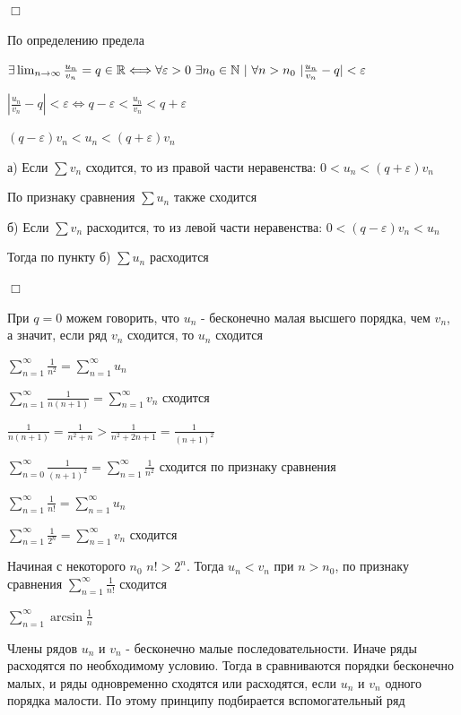 \documentclass[12pt]{article}
\begin{document}
    \begin{MyProof}
        $\Box$

        По определению предела

        $\exists \lim_{n \to \infty} \frac{u_n}{v_n} = q \in \Real \Longleftrightarrow \forall \varepsilon > 0 \ \exists n_0 \in \Natural \ | \ \forall n > n_0 \ |\frac{u_n}{v_n} - q| < \varepsilon$

        $|\frac{u_n}{v_n} - q| < \varepsilon \Longleftrightarrow q - \varepsilon < \frac{u_n}{v_n} < q + \varepsilon$

        $(q - \varepsilon) v_n < u_n < (q + \varepsilon) v_n$

        а) Если $\sum v_n$ сходится, то из правой части неравенства: $0 < u_n < (q + \varepsilon) v_n$

        По признаку сравнения $\sum u_n$ также сходится

        б) Если $\sum v_n$ расходится, то из левой части неравенства: $0 < (q - \varepsilon) v_n < u_n$

        Тогда по пункту б)  $\sum u_n$ расходится

        $\Box$
    \end{MyProof}

    \Nota При $q = 0$ можем говорить, что $u_n$ - бесконечно малая высшего порядка, чем $v_n$, а значит, если ряд $v_n$
    сходится, то $u_n$ сходится

     $\sum_{n = 1}^\infty \frac{1}{n^2} = \sum_{n = 1}^\infty u_n$

    $\sum_{n = 1}^\infty \frac{1}{n(n + 1)} = \sum_{n = 1}^\infty v_n$ сходится

    $\frac{1}{n(n + 1)} = \frac{1}{n^2 + n} > \frac{1}{n^2 + 2n + 1} = \frac{1}{(n + 1)^2}$

    $\sum_{n = 0}^\infty \frac{1}{(n + 1)^2} = \sum_{n = 1}^\infty \frac{1}{n^2}$ сходится по признаку сравнения

     $\sum_{n = 1}^\infty \frac{1}{n!} = \sum_{n = 1}^\infty u_n$

    $\sum_{n = 1}^\infty \frac{1}{2^n} = \sum_{n = 1}^\infty v_n$ сходится

    Начиная с некоторого $n_0$ $n! > 2^n$. Тогда $u_n < v_n$ при $n > n_0$, по признаку сравнения $\sum_{n = 1}^\infty \frac{1}{n!}$ сходится


     $\sum_{n = 1}^\infty \arcsin \frac{1}{n}$

    \Nota Члены рядов $u_n$ и $v_n$ - бесконечно малые последовательности. Иначе ряды расходятся по необходимому условию.
    Тогда в  сравниваются порядки бесконечно малых, и ряды одновременно сходятся или расходятся, если $u_n$ и $v_n$ одного
    порядка малости. По этому принципу подбирается вспомогательный ряд
\end{document}
